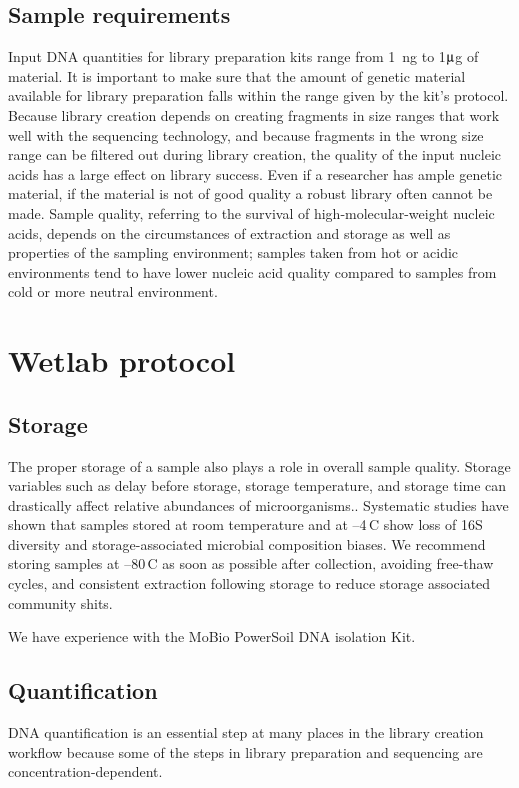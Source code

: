 \documentclass[graybox]{svmult}
\begin{document}
\subsection{Sample requirements }
\label{subsec:4}
%
Input DNA quantities for library preparation kits range from 1~ng to  1$\umu$g of material. It is important to make sure that the amount of genetic material available for library preparation falls within the range given by the kit's protocol.
%
Because library creation depends on creating fragments in size ranges that work well with the sequencing technology, and because fragments in the wrong size range can be filtered out during library creation,  the quality of the input nucleic acids has a large effect on library success. 
Even if a researcher has ample genetic material, if the material is not of good quality a robust library often cannot be made. 
Sample quality, referring to the survival of high-molecular-weight nucleic acids, depends on the circumstances of extraction and storage as well as properties of the sampling environment; samples taken from hot or acidic environments tend to have lower nucleic acid quality compared to samples from cold or more neutral environment.


\section{Wetlab protocol}

\subsection{Storage}
The proper storage of a sample also plays a role in overall sample quality.  Storage variables such as delay before storage, storage temperature, and storage time can drastically affect relative abundances of microorganisms.. Systematic studies have shown that samples stored at room temperature and at --4\degree\,C show loss of 16S diversity and storage-associated microbial composition biases\cite{Rubin2013Investigating}.  We recommend storing samples at --80\degree\,C as soon as possible after collection, avoiding free-thaw cycles, and consistent extraction following storage to reduce storage associated community shits.  

We have experience with the MoBio PowerSoil DNA isolation Kit.    

\subsection{Quantification}
DNA quantification is an essential step at many places in the library creation workflow because some of the steps in library preparation and sequencing are concentration-dependent.
\end{document}
